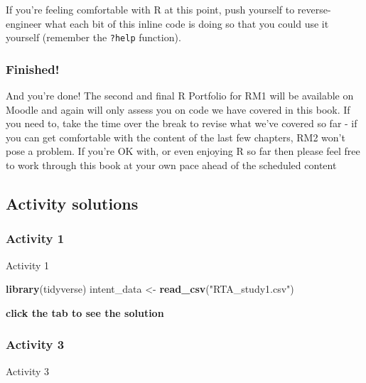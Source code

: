 \documentclass[]{book}
\newenvironment{Shaded}{\begin{snugshade}}{\end{snugshade}}
\newcommand{\KeywordTok}[1]{\textcolor[rgb]{0.13,0.29,0.53}{\textbf{#1}}}
\newcommand{\NormalTok}[1]{#1}
\newcommand{\StringTok}[1]{\textcolor[rgb]{0.31,0.60,0.02}{#1}}
\begin{document}
If you're feeling comfortable with R at this point, push yourself to reverse-engineer what each bit of this inline code is doing so that you could use it yourself (remember the \texttt{?help} function).

\hypertarget{finished-3}{%
\subsubsection{Finished!}\label{finished-3}}

And you're done! The second and final R Portfolio for RM1 will be available on Moodle and again will only assess you on code we have covered in this book. If you need to, take the time over the break to revise what we've covered so far - if you can get comfortable with the content of the last few chapters, RM2 won't pose a problem. If you're OK with, or even enjoying R so far then please feel free to work through this book at your own pace ahead of the scheduled content

\hypertarget{activity-solutions-2}{%
\subsection{Activity solutions}\label{activity-solutions-2}}

\hypertarget{activity-1}{%
\subsubsection{Activity 1}\label{activity-1}}

Activity 1

\begin{Shaded}
\begin{Highlighting}[]
\KeywordTok{library}\NormalTok{(tidyverse)}
\NormalTok{intent_data <-}\StringTok{ }\KeywordTok{read_csv}\NormalTok{(}\StringTok{"RTA_study1.csv"}\NormalTok{)}
\end{Highlighting}
\end{Shaded}

\textbf{click the tab to see the solution}

\hypertarget{activity-3-1}{%
\subsubsection{Activity 3}\label{activity-3-1}}

Activity 3
\end{document}
